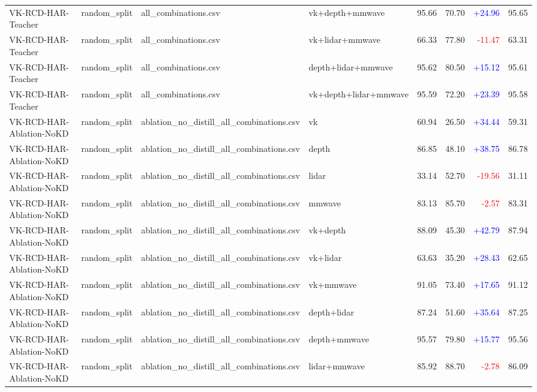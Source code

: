 \documentclass[10pt]{article}
\begin{document}
\begin{longtable}{llllrrrr}
VK-RCD-HAR-Teacher & random\_split & all\_combinations.csv & vk+depth+mmwave & 95.66 & 70.70 & \textcolor{blue}{+24.96} & 95.65\\
VK-RCD-HAR-Teacher & random\_split & all\_combinations.csv & vk+lidar+mmwave & 66.33 & 77.80 & \textcolor{red}{-11.47} & 63.31\\
VK-RCD-HAR-Teacher & random\_split & all\_combinations.csv & depth+lidar+mmwave & 95.62 & 80.50 & \textcolor{blue}{+15.12} & 95.61\\
VK-RCD-HAR-Teacher & random\_split & all\_combinations.csv & vk+depth+lidar+mmwave & 95.59 & 72.20 & \textcolor{blue}{+23.39} & 95.58\\
VK-RCD-HAR-Ablation-NoKD & random\_split & ablation\_no\_distill\_all\_combinations.csv & vk & 60.94 & 26.50 & \textcolor{blue}{+34.44} & 59.31\\
VK-RCD-HAR-Ablation-NoKD & random\_split & ablation\_no\_distill\_all\_combinations.csv & depth & 86.85 & 48.10 & \textcolor{blue}{+38.75} & 86.78\\
VK-RCD-HAR-Ablation-NoKD & random\_split & ablation\_no\_distill\_all\_combinations.csv & lidar & 33.14 & 52.70 & \textcolor{red}{-19.56} & 31.11\\
VK-RCD-HAR-Ablation-NoKD & random\_split & ablation\_no\_distill\_all\_combinations.csv & mmwave & 83.13 & 85.70 & \textcolor{red}{-2.57} & 83.31\\
VK-RCD-HAR-Ablation-NoKD & random\_split & ablation\_no\_distill\_all\_combinations.csv & vk+depth & 88.09 & 45.30 & \textcolor{blue}{+42.79} & 87.94\\
VK-RCD-HAR-Ablation-NoKD & random\_split & ablation\_no\_distill\_all\_combinations.csv & vk+lidar & 63.63 & 35.20 & \textcolor{blue}{+28.43} & 62.65\\
VK-RCD-HAR-Ablation-NoKD & random\_split & ablation\_no\_distill\_all\_combinations.csv & vk+mmwave & 91.05 & 73.40 & \textcolor{blue}{+17.65} & 91.12\\
VK-RCD-HAR-Ablation-NoKD & random\_split & ablation\_no\_distill\_all\_combinations.csv & depth+lidar & 87.24 & 51.60 & \textcolor{blue}{+35.64} & 87.25\\
VK-RCD-HAR-Ablation-NoKD & random\_split & ablation\_no\_distill\_all\_combinations.csv & depth+mmwave & 95.57 & 79.80 & \textcolor{blue}{+15.77} & 95.56\\
VK-RCD-HAR-Ablation-NoKD & random\_split & ablation\_no\_distill\_all\_combinations.csv & lidar+mmwave & 85.92 & 88.70 & \textcolor{red}{-2.78} & 86.09\\

\end{longtable}
\end{document}
